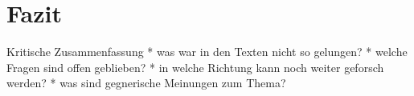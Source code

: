 \section{Fazit}

Kritische Zusammenfassung
* was war in den Texten nicht so gelungen?
* welche Fragen sind offen geblieben?
* in welche Richtung kann noch weiter geforsch werden?
* was sind gegnerische Meinungen zum Thema?
